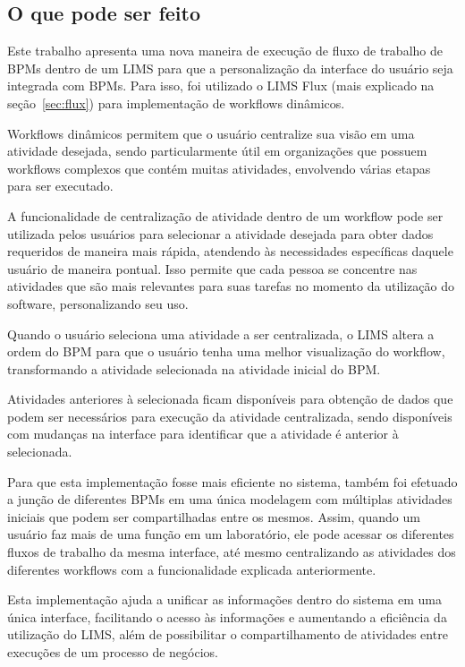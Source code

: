 \subsection{O que pode ser feito}


Este trabalho apresenta uma nova maneira de execução de fluxo de trabalho de BPMs dentro de um LIMS para que a personalização da interface do usuário seja integrada com BPMs. Para isso, foi utilizado o LIMS Flux (mais explicado na seção~\ref{sec:flux}) para implementação de workflows dinâmicos.

Workflows dinâmicos permitem que o usuário centralize sua visão em uma atividade desejada, sendo particularmente útil em organizações que possuem workflows complexos que contém muitas atividades, envolvendo várias etapas para ser executado.


A funcionalidade de centralização de atividade dentro de um workflow pode ser utilizada pelos usuários para selecionar a atividade desejada para obter dados requeridos de maneira mais rápida, atendendo às necessidades específicas daquele usuário de maneira pontual. Isso permite que cada pessoa se concentre nas atividades que são mais relevantes para suas tarefas no momento da utilização do software, personalizando seu uso.

Quando o usuário seleciona uma atividade a ser centralizada, o LIMS altera a ordem do BPM para que o usuário tenha uma melhor visualização do workflow, transformando a atividade selecionada na atividade inicial do BPM.

Atividades anteriores à selecionada ficam disponíveis para obtenção de dados que podem ser necessários para execução da atividade centralizada, sendo disponíveis com mudanças na interface para identificar que a atividade é anterior à selecionada.


Para que esta implementação fosse mais eficiente no sistema, também foi efetuado a junção de diferentes BPMs em uma única modelagem com múltiplas atividades iniciais que podem ser compartilhadas entre os mesmos. Assim, quando um usuário faz mais de uma função em um laboratório, ele pode acessar os diferentes fluxos de trabalho da mesma interface, até mesmo centralizando as atividades dos diferentes workflows com a funcionalidade explicada anteriormente.

Esta implementação ajuda a unificar as informações dentro do sistema em uma única interface, facilitando o acesso às informações e aumentando a eficiência da utilização do LIMS, além de possibilitar o compartilhamento de atividades entre execuções de um processo de negócios.



